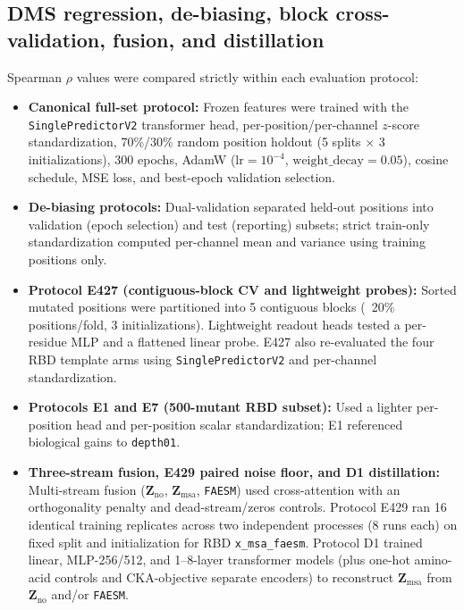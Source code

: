 \documentclass[10pt,a4paper]{article}
\begin{document}
\subsection{DMS regression, de-biasing, block cross-validation, fusion, and distillation}
Spearman $\rho$ values were compared strictly within each evaluation protocol:
\begin{itemize}
    \setlength{\itemsep}{2pt}\setlength{\parskip}{0pt}
    \item \textbf{Canonical full-set protocol:} Frozen features were trained with the \texttt{SinglePredictorV2} transformer head, per-position/per-channel $z$-score standardization, 70\%/30\% random position holdout (5 splits $\times$ 3 initializations), 300 epochs, AdamW ($\text{lr}=10^{-4}$, $\text{weight\_decay}=0.05$), cosine schedule, MSE loss, and best-epoch validation selection.
    \item \textbf{De-biasing protocols:} Dual-validation separated held-out positions into validation (epoch selection) and test (reporting) subsets; strict train-only standardization computed per-channel mean and variance using training positions only.
    \item \textbf{Protocol E427 (contiguous-block CV and lightweight probes):} Sorted mutated positions were partitioned into 5 contiguous blocks (~20\% positions/fold, 3 initializations). Lightweight readout heads tested a per-residue MLP and a flattened linear probe. E427 also re-evaluated the four RBD template arms using \texttt{SinglePredictorV2} and per-channel standardization.
    \item \textbf{Protocols E1 and E7 (500-mutant RBD subset):} Used a lighter per-position head and per-position scalar standardization; E1 referenced biological gains to \texttt{depth01}.
    \item \textbf{Three-stream fusion, E429 paired noise floor, and D1 distillation:} Multi-stream fusion ($\mathbf{Z}_{\mathrm{no}}$, $\mathbf{Z}_{\mathrm{msa}}$, \texttt{FAESM}) used cross-attention with an orthogonality penalty and dead-stream/zeros controls. Protocol E429 ran 16 identical training replicates across two independent processes (8 runs each) on fixed split and initialization for RBD \texttt{x\_msa\_faesm}. Protocol D1 trained linear, MLP-256/512, and 1--8-layer transformer models (plus one-hot amino-acid controls and CKA-objective separate encoders) to reconstruct $\mathbf{Z}_{\mathrm{msa}}$ from $\mathbf{Z}_{\mathrm{no}}$ and/or \texttt{FAESM}.
\end{itemize}
\end{document}
